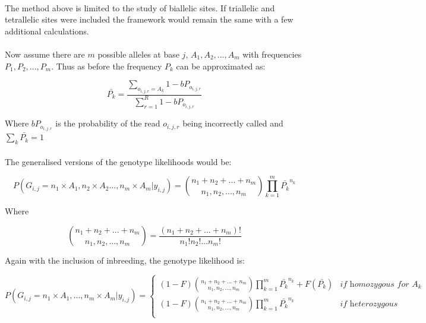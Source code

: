 \documentclass[11pt]{article}
\begin{document}
\paragraph{}The method above is limited to the study of biallelic sites. If triallelic and tetrallelic sites were included the framework would remain the same with a few additional calculations.
\paragraph{}Now assume there are $m$ possible alleles at base $j$, $A_{1},A_{2},...,A_{m}$ with frequencies $P_{1},P_{2},...,P_{m}$. Thus as before the frequency $P_{k}$ can be approximated as:

\begin{equation}
\bar{P_{k}}=\frac{\sum_{o_{i,j,r}=A_{k}} 1-bP_{o_{i,j,r} } }{\sum_{r=1}^{R} 1-bP_{o_{i,j,r} } }
\end{equation}

Where $bP_{o_{i,j,r} }$ is the probability of the read $o_{i,j,r}$ being incorrectly called and $\sum_{k}\bar{P_{k}}=1$
\paragraph{}The generalised versions of the genotype likelihoods would be:

\begin{equation}
P(G_{i,j}=n_{1}\times A_{1},n_{2}\times A_{2}...,n_{m}\times A_{m}|y_{i,j})=\binom{n_{1} + n_{2} + ... + n_{m}  }{n_{1},n_{2},...,n_{m} } \prod_{k=1}^{m}\bar{P_{k} }^{n_{k}} 
\end{equation}

Where

\begin{equation*}
\binom{n_{1} + n_{2} + ... + n_{m}  }{n_{1},n_{2},...,n_{m} } = \frac{(n_{1} + n_{2} + ... + n_{m})!}{n_{1}!n_{2}!...n_{m}!}
\end{equation*}

Again with the inclusion of inbreeding, the genotype likelihood is:

\begin{equation}
P(G_{i,j}= n_{1}\times A_{1},...,n_{m}\times A_{m}|y_{i,j})=	\begin{cases} 
		(1-F)\binom{n_{1} + n_{2} + ... + n_{m}  }{n_{1},n_{2},...,n_{m} } \prod_{k=1}^{m}\bar{P_{k} }^{n_{k}} + F(\bar{P_{k}}) & \textit{if homozygous for } A_{k}  \\
				(1-F)\binom{n_{1} + n_{2} + ... + n_{m}  }{n_{1},n_{2},...,n_{m} } \prod_{k=1}^{m}\bar{P_{k} }^{n_{k}}  & \textit{if heterozygous} \\
	\end{cases}
\end{equation}
\end{document}
